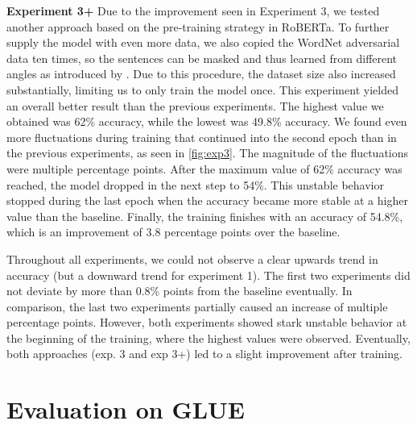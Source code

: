 \documentclass{article}
\begin{document}
\textbf{Experiment 3+}
Due to the improvement seen in Experiment 3, we tested another approach based on the pre-training strategy in RoBERTa. To further supply the model with even more data, we also copied the WordNet adversarial data ten times, so the sentences can be masked and thus learned from different angles as introduced by \cite{liu2019roberta}. Due to this procedure, the dataset size also increased substantially, limiting us to only train the model once.
This experiment yielded an overall better result than the previous experiments. The highest value we obtained was 62\% accuracy, while the lowest was 49.8\% accuracy. We found even more fluctuations during training that continued into the second epoch than in the previous experiments, as seen in \ref{fig:exp3}. The magnitude of the fluctuations were multiple percentage points. After the maximum value of 62\% accuracy was reached, the model dropped in the next step to 54\%. This unstable behavior stopped during the last epoch when the accuracy became more stable at a higher value than the baseline. Finally, the training finishes with an accuracy of 54.8\%, which is an improvement of 3.8 percentage points over the baseline.

Throughout all experiments, we could not observe a clear upwards trend in accuracy (but a downward trend for experiment 1). The first two experiments did not deviate by more than 0.8\% points from the baseline eventually. In comparison, the last two experiments partially caused an increase of multiple percentage points. However, both experiments showed stark unstable behavior at the beginning of the training, where the highest values were observed. Eventually, both approaches (exp. 3 and exp 3+) led to a slight improvement after training.

\section{Evaluation on GLUE}
\label{section::glue}
\end{document}

